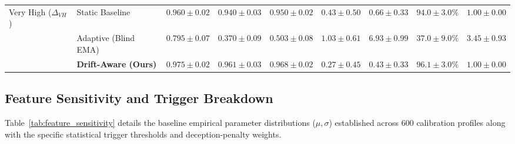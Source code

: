 \documentclass[conference]{IEEEtran}
\begin{document}
\begin{table}[t]
{\begin{tabular}{llccccccc}
\midrule
Very High ($\Delta_{VH}$) & Static Baseline & $0.960 \pm 0.02$ & $0.940 \pm 0.03$ & $0.950 \pm 0.02$ & $0.43 \pm 0.50$ & $0.66 \pm 0.33$ & $94.0 \pm 3.0\%$ & $1.00 \pm 0.00$ \\
                       & Adaptive (Blind EMA) & $0.795 \pm 0.07$ & $0.370 \pm 0.09$ & $0.503 \pm 0.08$ & $1.03 \pm 0.61$ & $6.93 \pm 0.99$ & $37.0 \pm 9.0\%$ & $3.45 \pm 0.93$ \\
                       & \textbf{Drift-Aware (Ours)} & $\mathbf{0.975 \pm 0.02}$ & $\mathbf{0.961 \pm 0.03}$ & $\mathbf{0.968 \pm 0.02}$ & $\mathbf{0.27 \pm 0.45}$ & $\mathbf{0.43 \pm 0.33}$ & $\mathbf{96.1 \pm 3.0\%}$ & $\mathbf{1.00 \pm 0.00}$ \\
\bottomrule
\end{tabular}%
}
\end{table}

\subsection{Feature Sensitivity and Trigger Breakdown}
Table~\ref{tab:feature_sensitivity} details the baseline empirical parameter distributions ($\mu, \sigma$) established across 600 calibration profiles along with the specific statistical trigger thresholds and deception-penalty weights.

\begin{table}[htbp]
\caption{Feature Sensitivity and Empirical Threshold Breakdown}
\label{tab:feature_sensitivity}
\centering
{}
\end{table}
\end{document}
